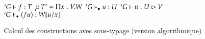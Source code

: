 \def\AppI{
\QAX{App}
{$`G \subtd f : T$}
{$\mu~T `= \Pi x : V. W$}
{$`G \seq u : U$}
{$`G \subt u : U \sub V $}
{$`G \seq (f u) : W [ u / x ]$}
{}
}

\begin{figure}[h]
  \begin{center}
    \def\fCenter{\wf}
    \def\type{\typei}
    
    \WfAtom\DP    
    \WfVar\DP
    
    \def\fCenter{\typei}
    \vspace{\infvspace}
    \PropSet\DP
    
    \vspace{\infvspace}
    \Var\DP
    
    \vspace{\infvspace}
    \Prod\DP
    
    \vspace{\infvspace}
    \Abs\DP

    \vspace{\infvspace}
    \AppI\DP

    \vspace{\infvspace}
    \LetIn\DP
    
    \vspace{\infvspace}
    \SigmaR\DP

    \vspace{\infvspace}
    \Sum\DP
    
    \vspace{\infvspace}
    \LetSum\DP
    
  \end{center}
  \label{typing-algo-rules}
  \caption{Calcul des constructions avec sous-typage (version algorithmique)}
\end{figure}

